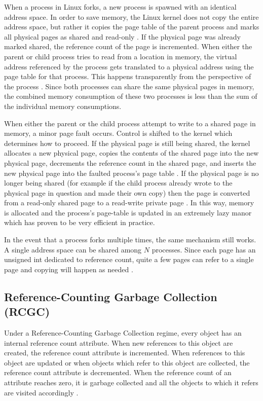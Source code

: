 \documentclass{article}
\begin{document}
When a process in Linux forks, a new process is spawned with an identical address space.  In order to save memory, the Linux kernel does not copy the entire address space, but rather it copies the page table of the parent process and marks all physical pages as shared and read-only \cite{VMM}.  If the physical page was already marked shared, the reference count of the page is incremented.  When either the parent or child process tries to read from a location in memory, the virtual address referenced by the process gets translated to a physical address using the page table for that process.  This happens transparently from the perspective of the process \cite{VMM}.  Since both processes can share the same physical pages in memory, the combined memory consumption of these two processes is less than the sum of the individual memory consumptions.

When either the parent or the child process attempt to write to a shared page in memory, a minor page fault occurs.  Control is shifted to the kernel which determines how to proceed.  If the physical page is still being shared, the kernel allocates a new physical page, copies the contents of the shared page into the new physical page, decrements the reference count in the shared page, and inserts the new physical page into the faulted process's page table \cite{VMM}.  If the physical page is no longer being shared (for example if the child process already wrote to the physical page in question and made their own copy) then the page is converted from a read-only shared page to a read-write private page \cite{VMM}.  In this way, memory is allocated and the process's page-table is updated in an extremely lazy manor which has proven to be very efficient in practice.  

In the event that a process forks multiple times, the same mechanism still works.  A single address space can be shared among $N$ processes.  Since each page has an unsigned int dedicated to reference count, quite a few pages can refer to a single page and copying will happen as needed \cite{kernelsource,VMM}.  

\subsection{Reference-Counting Garbage Collection (RCGC)}\label{sec:RCGC}

Under a Reference-Counting Garbage Collection regime, every object has an internal reference count attribute.  When new references to this object are created, the reference count attribute is incremented.  When references to this object are updated or when objects which refer to this object are collected, the reference count attribute is decremented.  When the reference count of an attribute reaches zero, it is garbage collected and all the objects to which it refers are visited accordingly \cite{GC-continuum}.  
\end{document}
